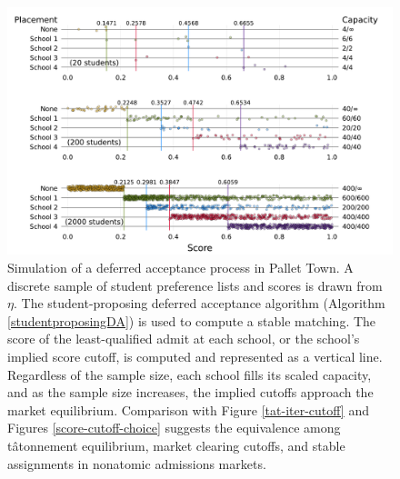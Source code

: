\documentclass[12pt]{article}
\theoremstyle{definition}
\begin{document}
\begin{figure}
\begin{center}\includegraphics[width=\linewidth, ]{plots/score-DA-placement.pdf}\end{center}
\captionsetup{singlelinecheck=off}
    \caption[.]{Simulation of a deferred acceptance process in Pallet Town. A discrete sample of student preference lists and scores is drawn from $\eta$. The student-proposing deferred acceptance algorithm (Algorithm \ref{studentproposingDA}) is used to compute a stable matching. The score of the least-qualified admit at each school, or the school's implied score cutoff, is computed and represented as a vertical line. Regardless of the sample size, each school fills its scaled capacity, and as the sample size increases, the implied cutoffs approach the market equilibrium. Comparison with Figure \ref{tat-iter-cutoff} and Figures \ref{score-cutoff-choice} suggests the equivalence among t\^{a}tonnement equilibrium, market clearing cutoffs, and stable assignments in nonatomic admissions markets.}
\label{score-DA-placement}
\end{figure}
\end{document}
